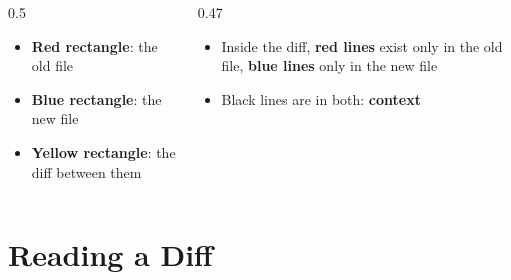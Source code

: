 \documentclass[aspectratio=169,10pt,compress]{beamer}
\begin{document}
\begin{frame}[t,fragile]
\begin{columns}[T]
\begin{column}{0.5\textwidth}
\begin{itemize}
      \item \textcolor{oldred}{\textbf{Red rectangle}}: the old file
      \item \textcolor{newblue}{\textbf{Blue rectangle}}: the new file
      \item \textcolor{diffborder}{\textbf{Yellow rectangle}}: the diff between them
    \end{itemize}
  \end{column}
  \begin{column}{0.47\textwidth}
    \begin{itemize}\small
      \item Inside the diff, \textcolor{oldred}{\textbf{red lines}} exist only in the old file,
            \textcolor{newblue}{\textbf{blue lines}} only in the new file
      \item Black lines are in both: \textbf{context}
    \end{itemize}
  \end{column}
\end{columns}
\end{frame}

\section[Formats]{Reading a Diff}
\end{document}
